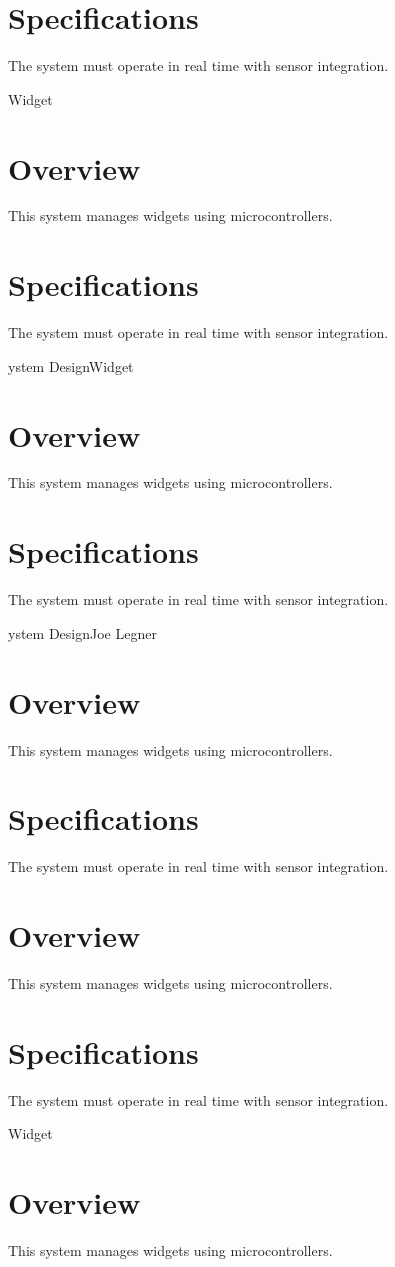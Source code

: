 \documentclass{article}
\begin{document}
\section{Specifications}
The system must operate in real time with sensor integration.

Widget \section{Overview}
This system manages widgets using microcontrollers.

\section{Specifications}
The system must operate in real time with sensor integration.

ystem DesignWidget \section{Overview}
This system manages widgets using microcontrollers.

\section{Specifications}
The system must operate in real time with sensor integration.

ystem DesignJoe Legner\section{Overview}
This system manages widgets using microcontrollers.

\section{Specifications}
The system must operate in real time with sensor integration.

\section{Overview}
This system manages widgets using microcontrollers.

\section{Specifications}
The system must operate in real time with sensor integration.

Widget \section{Overview}
This system manages widgets using microcontrollers.
\end{document}
